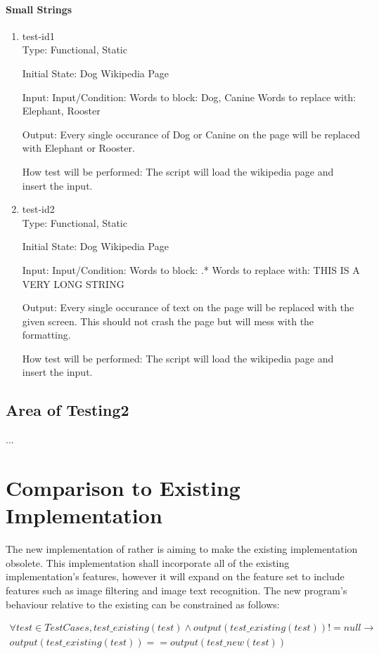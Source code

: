 \documentclass[12pt, titlepage]{article}
\begin{document}
\paragraph{Small Strings}
\begin{enumerate}
\item{test-id1\\}
Type: Functional, Static
					
Initial State: Dog Wikipedia Page
					
Input: Input/Condition: Words to block: Dog, Canine
Words to replace with: Elephant, Rooster
					
Output: Every single occurance of Dog or Canine on the page will be replaced with Elephant or Rooster.
					
How test will be performed: The script will load the wikipedia page and insert the input. 
					
\item{test-id2\\}
Type: Functional, Static
					
Initial State: Dog Wikipedia Page
					
Input: Input/Condition: Words to block: .*
Words to replace with: THIS IS A VERY LONG STRING

Output: Every single occurance of text on the page will be replaced with the given screen. This should not crash the page but will mess with the formatting.
					
How test will be performed: The script will load the wikipedia page and insert the input.
\end{enumerate}
\subsection{Area of Testing2}
...
	
\section{Comparison to Existing Implementation}
The new implementation of rather is aiming to make the existing implementation obsolete. This implementation shall incorporate all of the existing implementation's features, however it will expand on the feature set to include features such as image filtering and image text recognition. The new program's behaviour relative to the existing can be constrained as follows:

\begin{multline}
\forall test \in TestCases, test\_existing(test) \wedge output(test\_existing(test)) != null  \rightarrow  \\ 
output(test\_existing(test)) == output(test\_new(test))
\end{multline}
\end{document}

